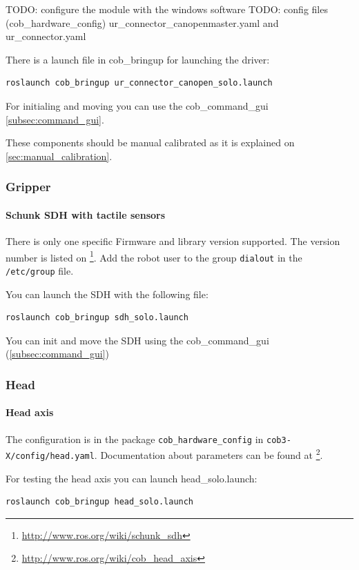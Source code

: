 TODO: configure the module with the windows software
TODO: config files (cob\_hardware\_config)  ur\_connector\_canopenmaster.yaml and ur\_connector.yaml


There is a launch file in cob\_bringup for launching the driver:

\begin{lstlisting}
roslaunch cob_bringup ur_connector_canopen_solo.launch
\end{lstlisting}

For initialing and moving you can use the cob\_command\_gui \ref{subsec:command_gui}.

These components should be manual calibrated as it is explained on \ref{sec:manual_calibration}.


\subsubsection{Gripper}

\paragraph{Schunk SDH with tactile sensors}
There is only one specific Firmware and library version supported. The version number is listed on \footnote{\url{http://www.ros.org/wiki/schunk_sdh}}. Add the robot user to the group \texttt{dialout} in the \texttt{/etc/group} file.

You can launch the SDH with the following file:
\begin{lstlisting}
roslaunch cob_bringup sdh_solo.launch
\end{lstlisting}

You can init and move the SDH using the cob\_command\_gui (\ref{subsec:command_gui})

\subsubsection{Head}

\paragraph{Head axis}
The configuration is in the package \texttt{cob\_hardware\_config} in \texttt{cob3-X/config/head.yaml}. Documentation about parameters can be found at \footnote{\url{http://www.ros.org/wiki/cob_head_axis}}.

For testing the head axis you can launch head\_solo.launch:
\begin{lstlisting}
roslaunch cob_bringup head_solo.launch
\end{lstlisting}

